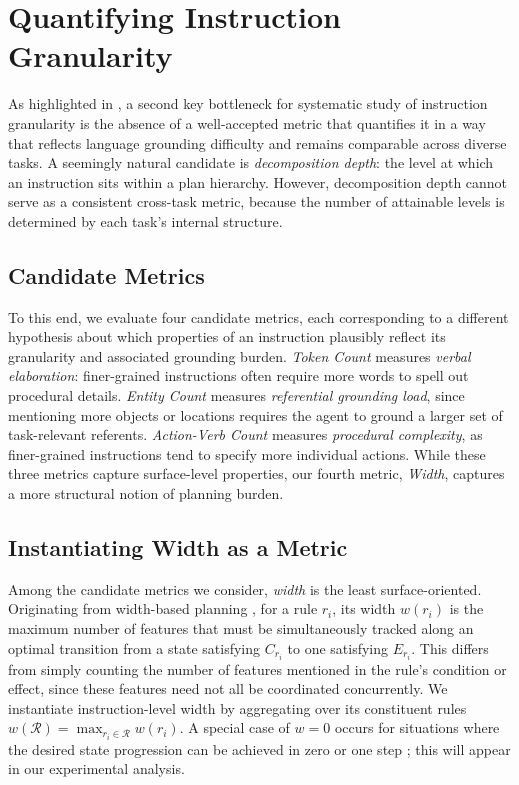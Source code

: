 \documentclass[11pt]{article}
\begin{document}
\section{Quantifying Instruction Granularity}
As highlighted in , a second key bottleneck for 
systematic study of instruction granularity is the absence of a 
well-accepted metric that quantifies it in a way that reflects 
language grounding difficulty and remains comparable across 
diverse tasks. A seemingly natural candidate is 
\emph{decomposition depth}: the level at which an instruction 
sits within a plan hierarchy. However, decomposition depth 
cannot serve as a consistent cross-task metric, because the 
number of attainable levels is determined by each task's 
internal structure. 

\subsection{Candidate Metrics}

To this end, we evaluate four candidate metrics, each corresponding to a different hypothesis about which properties of an instruction plausibly reflect its granularity and associated grounding burden. 
\emph{Token Count} measures \emph{verbal elaboration}: finer-grained instructions often require more words to spell out procedural details.
\emph{Entity Count} measures \emph{referential grounding load}, since mentioning more objects or locations requires the agent to ground a larger set of task-relevant referents. 
\emph{Action-Verb Count} measures \emph{procedural complexity}, as finer-grained instructions tend to specify more individual actions. 
While these three metrics capture surface-level properties, our fourth metric, \emph{Width}, captures a more structural notion of planning burden.

\subsection{Instantiating Width as a Metric}

Among the candidate metrics we consider, \emph{width} is the least surface-oriented. Originating from width-based planning \citep{DBLP:conf/ecai/LipovetzkyG12,DBLP:conf/aaai/LipovetzkyG17}, for a rule $r_i$, its width $w(r_i)$ is the maximum number of features that must be simultaneously tracked along an optimal transition from a state satisfying $C_{r_i}$ to one satisfying $E_{r_i}$. This differs from simply counting the number of features mentioned in the rule's condition or effect, since these features need not all be coordinated concurrently. We instantiate instruction-level width by aggregating over its constituent rules $w(\mathcal{R}) = \max_{r_i \in \mathcal{R}} w(r_i)$. A special case of $w=0$ occurs for situations where the desired state progression can be achieved in zero or one step \citep{bonet2024general}; this will appear in our experimental analysis. 
\end{document}
